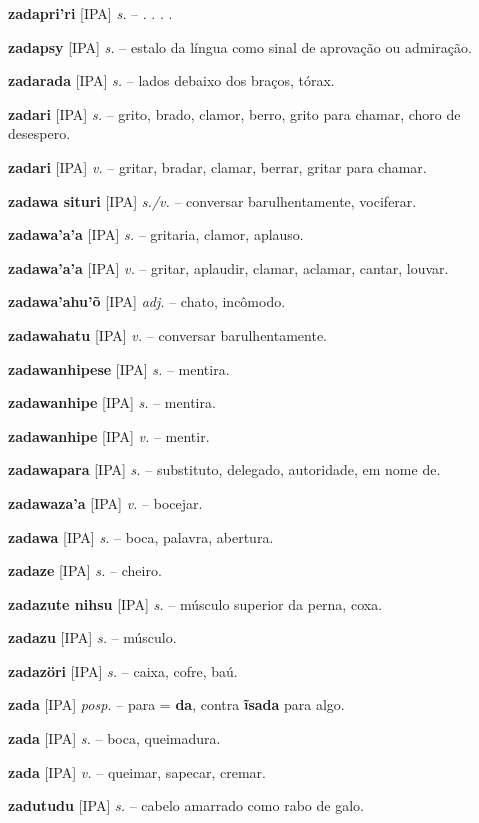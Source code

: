 \textbf{zadapri'ri} [IPA] \textit{s.} -- . . . .

\textbf{zadapsy} [IPA] \textit{s.} -- estalo da língua como sinal de aprovação ou admiração.

\textbf{zadarada} [IPA] \textit{s.} -- lados debaixo dos braços, tórax.

\textbf{zadari} [IPA] \textit{s.} -- grito, brado, clamor, berro, grito para chamar, choro de desespero.

\textbf{zadari} [IPA] \textit{v.} -- gritar, bradar, clamar, berrar, gritar para chamar.

\textbf{zadawa situri} [IPA] \textit{s./v.} -- conversar barulhentamente, vociferar.

\textbf{zadawa'a'a} [IPA] \textit{s.} -- gritaria, clamor, aplauso.

\textbf{zadawa'a'a} [IPA] \textit{v.} -- gritar, aplaudir, clamar, aclamar, cantar, louvar.

\textbf{zadawa'ahu'õ} [IPA] \textit{adj.} -- chato, incômodo.

\textbf{zadawahatu} [IPA] \textit{v.} -- conversar barulhentamente.

\textbf{zadawanhipese} [IPA] \textit{s.} -- mentira.

\textbf{zadawanhipe} [IPA] \textit{s.} -- mentira.

\textbf{zadawanhipe} [IPA] \textit{v.} -- mentir.

\textbf{zadawapara} [IPA] \textit{s.} -- substituto, delegado, autoridade, em nome de.

\textbf{zadawaza'a} [IPA] \textit{v.} -- bocejar.

\textbf{zadawa} [IPA] \textit{s.} -- boca, palavra, abertura.

\textbf{zadaze} [IPA] \textit{s.} -- cheiro.

\textbf{zadazute nihsu} [IPA] \textit{s.} -- músculo superior da perna, coxa.

\textbf{zadazu} [IPA] \textit{s.} -- músculo.

\textbf{zadazöri} [IPA] \textit{s.} -- caixa, cofre, baú.

\textbf{zada} [IPA] \textit{posp.} -- para = \textbf{da}, contra  \textbf{ĩsada} para algo.

\textbf{zada} [IPA] \textit{s.} -- boca, queimadura.

\textbf{zada} [IPA] \textit{v.} -- queimar, sapecar, cremar.

\textbf{zadutudu} [IPA] \textit{s.} -- cabelo amarrado como rabo de galo.

